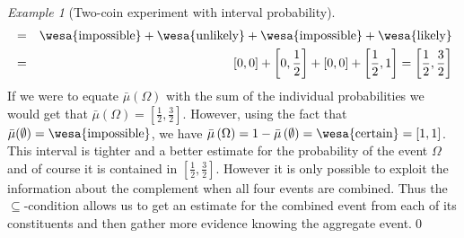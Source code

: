 \documentclass{article}
\theoremstyle{remark}
\newtheorem{example}{Example}
\newcommand{\imposs}{{\mbox{\wesa{impossible}}}}
\newcommand{\likely}{{\mbox{\wesa{likely}}}}
\newcommand{\unlikely}{{\mbox{\wesa{unlikely}}}}
\newcommand{\necess}{{\mbox{\wesa{certain}}}}
\newcommand{\yutsung}[1]{\fbox{\begin{minipage}{0.9\textwidth}\color{purple}{Yu-Tsung says: #1}\end{minipage}}}
\newcommand{\gerardo}[1]{\fbox{\begin{minipage}{0.9\textwidth}\color{OliveGreen}{Gerardo says: #1}\end{minipage}}}
\begin{document}
\begin{example}[Two-coin experiment with interval probability]
\begin{eqnarray*}
 & = & \imposs+\unlikely+\imposs+\likely\\
 & = & \left[0,0\right]+\left[0,\frac{1}{2}\right]+\left[0,0\right]+\left[\frac{1}{2},1\right]=\left[\frac{1}{2},\frac{3}{2}\right]
\end{eqnarray*}
If we were to equate $\bar{\mu}(\Omega)$ with the sum of the individual
probabilities we would get that
$\bar{\mu}(\Omega) = \left[\frac{1}{2},\frac{3}{2}\right]$. However,
using the fact that $\bar{\mu}(\emptyset)=\imposs$, we have
$\bar{\mu}\left(\Omega\right)=1-\bar{\mu}\left(\emptyset\right)=\necess=[1,1]$. This
interval is tighter and a better estimate for the probability of the
event $\Omega$ and of course it is contained in
$[\frac{1}{2},\frac{3}{2}]$. However it is only possible to exploit
the information about the complement when all four events are
combined. Thus the $\subseteq$-condition allows us to get an estimate
for the combined event from each of its constituents and then gather
more evidence knowing the aggregate event.\qed\end{example}




\end{document}
